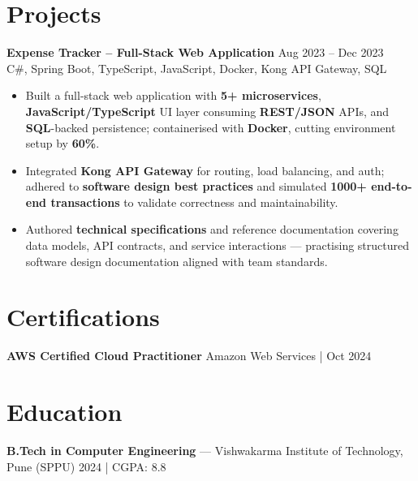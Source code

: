 \documentclass[10pt,letterpaper]{article}
\newcommand{\resumeSubheading}[4]{%
  \textbf{#1} \hfill #2 \\
  #3 \hfill #4 \\
}
\begin{document}
\section*{Projects}

\resumeSubheading{Expense Tracker -- Full-Stack Web Application}{Aug 2023 -- Dec 2023}{}{C\#, Spring Boot, TypeScript, JavaScript, Docker, Kong API Gateway, SQL}
\begin{itemize}
    \item Built a full-stack web application with \textbf{5+ microservices}, \textbf{JavaScript/TypeScript} UI layer consuming \textbf{REST/JSON} APIs, and \textbf{SQL}-backed persistence; containerised with \textbf{Docker}, cutting environment setup by \textbf{60\%}.
    \item Integrated \textbf{Kong API Gateway} for routing, load balancing, and auth; adhered to \textbf{software design best practices} and simulated \textbf{1000+ end-to-end transactions} to validate correctness and maintainability.
    \item Authored \textbf{technical specifications} and reference documentation covering data models, API contracts, and service interactions --- practising structured software design documentation aligned with team standards.
\end{itemize}

\section*{Certifications}
\textbf{AWS Certified Cloud Practitioner} \hfill Amazon Web Services \;|\; Oct 2024

\section*{Education}
\textbf{B.Tech in Computer Engineering} --- Vishwakarma Institute of Technology, Pune (SPPU) \hfill 2024 \;|\; CGPA: 8.8
\end{document}
